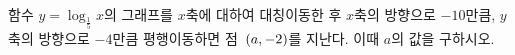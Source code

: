 함수 $y=\log_{\frac{1}{5}} x$의 그래프를 $x$축에 대하여 대칭이동한 후 $x$축의 방향으로 $-10$만큼, $y$축의 방향으로 $-4$만큼 평행이동하면 점~$(a{,}\mkern3mu\mathopen{}-2)$를 지난다. 이때 $a$의 값을 구하시오.

